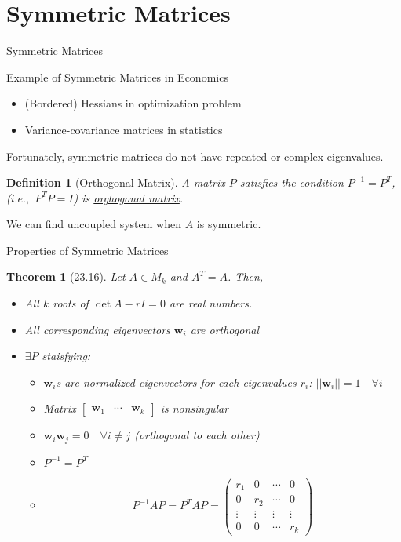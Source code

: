 \documentclass[final]{beamer}
\newtheorem{defn}{Definition}
\newtheorem{thm}{Theorem}
\newcommand{\bd}{\mathbf}
\begin{document}
\section{Symmetric Matrices} %
\label{sec:symmetric_matrices}
\begin{frame}[t]{Symmetric Matrices}
	\begin{block}
		{Example of Symmetric Matrices in Economics}
		\begin{itemize}
			\item (Bordered) Hessians in optimization problem
			\item Variance-covariance matrices in statistics
		\end{itemize}
		Fortunately, symmetric matrices do not have repeated or complex eigenvalues. 
	\end{block}
	\begin{defn}
		[Orthogonal Matrix] A matrix $P$ satisfies the condition $P^{-1}=P^T$, ($i.e.,$ $P^T P = I$) is \uline{orghogonal matrix}.
	\end{defn}
	We can find uncoupled system when $A$ is symmetric.
\end{frame}
\begin{frame}[t]{Properties of Symmetric Matrices}
	\begin{thm}
		[23.16] Let $A\in M_k$ and $A^T=A$. Then, 
		\begin{itemize}
			\item All $k$ roots of $\det{A-rI}=0$ are real numbers. 
			\item All corresponding eigenvectors $\bd{w}_i$ are orthogonal
			\item $\exists P$ staisfying:
			\begin{itemize}
				\item $\bd{w}_i$s are normalized eigenvectors for each eigenvalues $r_i$: $||\bd{w}_i||=1 \quad\forall i$
				\item Matrix $\begin{bmatrix}\bd{w}_1&\cdots&\bd{w}_k
				\end{bmatrix}$ is nonsingular
				\item $\bd{w}_i\bd{w}_j=0\quad \forall i\neq j$ (orthogonal to each other)
				\item $P^{-1}=P^T$
				\item \[
					P^{-1}AP = P^TAP = \begin{pmatrix}
						r_1 & 0 & \cdots & 0\\
						0 & r_2 & \cdots & 0\\
						\vdots & \vdots & \vdots & \vdots\\
						0 & 0 & \cdots & r_k
					\end{pmatrix}
				\]
			\end{itemize}
		\end{itemize}
	\end{thm}
\end{frame}
\end{document}
